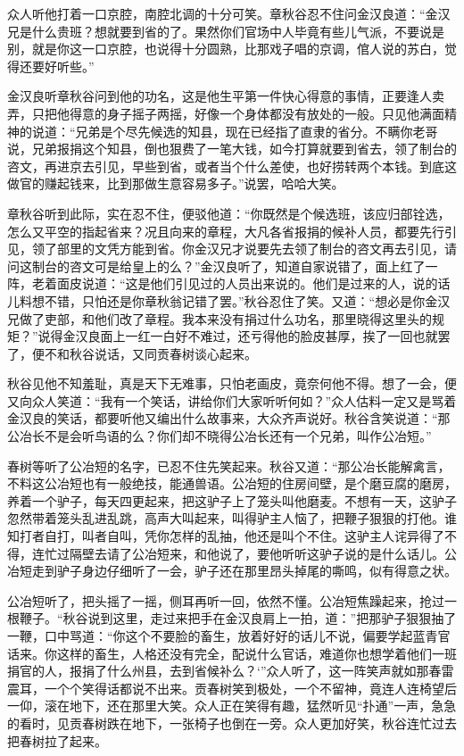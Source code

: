 \documentclass[12pt,UTF8]{ctexbook}
\begin{document}
{{{众人听他打着一口京腔，南腔北调的十分可笑。章秋谷忍不住问金汉良道：“金汉兄是什么贵班？想就要到省的了。果然你们官场中人毕竟有些儿气派，不要说是别，就是你这一口京腔，也说得十分圆熟，比那戏子唱的京调，倌人说的苏白，觉得还要好听些。”

金汉良听章秋谷问到他的功名，这是他生平第一件快心得意的事情，正要逢人卖弄，只把他得意的身子摇子两摇，好像一个身体都没有放处的一般。只见他满面精神的说道：“兄弟是个尽先候选的知县，现在已经指了直隶的省分。不瞒你老哥说，兄弟报捐这个知县，倒也狠费了一笔大钱，如今打算就要到省去，领了制台的咨文，再进京去引见，早些到省，或者当个什么差使，也好捞转两个本钱。到底这做官的赚起钱来，比到那做生意容易多子。”说罢，哈哈大笑。

章秋谷听到此际，实在忍不住，便驳他道：“你既然是个候选班，该应归部铨选，怎么又平空的指起省来？况且向来的章程，大凡各省报捐的候补人员，都要先行引见，领了部里的文凭方能到省。你金汉兄才说要先去领了制台的咨文再去引见，请问这制台的咨文可是给皇上的么？”金汉良听了，知道自家说错了，面上红了一阵，老着面皮说道：“这是他们引见过的人员出来说的。他们是过来的人，说的话儿料想不错，只怕还是你章秋翁记错了罢。”秋谷忍住了笑。又道：“想必是你金汉兄做了吏部，和他们改了章程。我本来没有捐过什么功名，那里晓得这里头的规矩？”说得金汉良面上一红一白好不难过，还亏得他的脸皮甚厚，挨了一回也就罢了，便不和秋谷说话，又同贡春树谈心起来。

秋谷见他不知羞耻，真是天下无难事，只怕老画皮，竟奈何他不得。想了一会，便又向众人笑道：“我有一个笑话，讲给你们大家听听何如？”众人估料一定又是骂着金汉良的笑话，都要听他又编出什么故事来，大众齐声说好。秋谷含笑说道：“那公冶长不是会听鸟语的么？你们却不晓得公冶长还有一个兄弟，叫作公冶短。”

春树等听了公冶短的名字，已忍不住先笑起来。秋谷又道：“那公冶长能解禽言，不料这公冶短也有一般绝技，能通兽语。公冶短的住房间壁，是个磨豆腐的磨房，养着一个驴子，每天四更起来，把这驴子上了笼头叫他磨麦。不想有一天，这驴子忽然带着笼头乱进乱跳，高声大叫起来，叫得驴主人恼了，把鞭子狠狠的打他。谁知打者自打，叫者自叫，凭你怎样的乱抽，他还是叫个不住。这驴主人诧异得了不得，连忙过隔壁去请了公冶短来，和他说了，要他听听这驴子说的是什么话儿。公冶短走到驴子身边仔细听了一会，驴子还在那里昂头掉尾的嘶鸣，似有得意之状。

公冶短听了，把头摇了一摇，侧耳再听一回，依然不懂。公冶短焦躁起来，抢过一根鞭子。“秋谷说到这里，走过来把手在金汉良肩上一拍，道：”把那驴子狠狠抽了一鞭，口中骂道：“你这个不要脸的畜生，放着好好的话儿不说，偏要学起蓝青官话来。你这样的畜生，人格还没有完全，配说什么官话，难道你也想学着他们一班捐官的人，报捐了什么州县，去到省候补么？‘”众人听了，这一阵笑声就如那春雷震耳，一个个笑得话都说不出来。贡春树笑到极处，一个不留神，竟连人连椅望后一仰，滚在地下，还在那里大笑。众人正在笑得有趣，猛然听见“扑通”一声，急急的看时，见贡春树跌在地下，一张椅子也倒在一旁。众人更加好笑，秋谷连忙过去把春树拉了起来。

}}}
\end{document}

